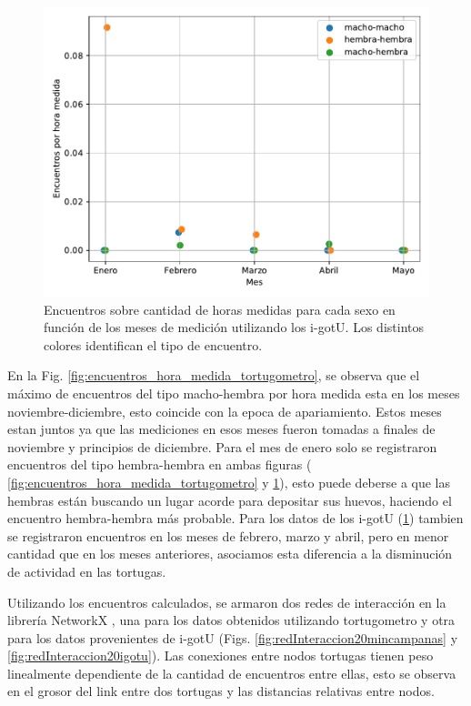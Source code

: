 \begin{figure}[ht]
    \begin{center}
       
   
    \includegraphics[width=\imsize]{Chap2/encuentros_por_hora_igotu.pdf}
\end{center}
    \caption[Encuentros por hora medida tomando los datos de los i-gotU.]{Encuentros sobre cantidad de horas medidas para cada sexo en función de los meses de medición utilizando los i-gotU. Los distintos colores identifican el tipo de encuentro.}
    \label{fig:encuentros_hora_medida_igotu}
\end{figure}
En la Fig. \ref{fig:encuentros_hora_medida_tortugometro}, se observa que el máximo de encuentros del tipo macho-hembra por hora medida esta en los meses noviembre-diciembre, esto coincide con la epoca de apariamiento. Estos meses estan juntos ya que las mediciones en esos meses fueron tomadas a finales de noviembre y principios de diciembre. Para el mes de enero solo se registraron encuentros del tipo hembra-hembra en ambas figuras ( \ref{fig:encuentros_hora_medida_tortugometro} y \ref{fig:encuentros_hora_medida_igotu}), esto puede deberse a que las hembras están buscando un lugar acorde para depositar sus huevos, haciendo el encuentro hembra-hembra más probable. Para los datos de los i-gotU (\ref{fig:encuentros_hora_medida_igotu}) tambien se registraron encuentros en los meses de febrero, marzo y abril, pero en menor cantidad que en los meses anteriores, asociamos esta diferencia a la disminución de actividad en las tortugas.


Utilizando los encuentros calculados, se armaron dos redes de interacción  en la librería NetworkX \cite{networkx}, una para los datos obtenidos utilizando  tortugometro y otra para los datos provenientes de i-gotU (Figs. \ref{fig:redInteraccion20mincampanas} y \ref{fig:redInteraccion20igotu}). Las conexiones entre nodos tortugas tienen peso linealmente dependiente de la cantidad de encuentros entre ellas, esto se observa en el grosor del link entre dos tortugas y las distancias relativas entre nodos.


